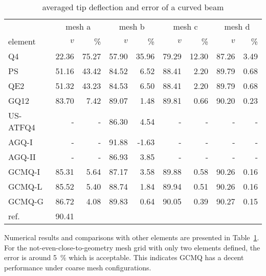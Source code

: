 \documentclass[3p,sort&compress,review,11pt]{elsarticle}
\newcommand*{\tabref}[1]{Table~\ref{#1}}
\begin{document}
\begin{table}[H]
\centering\scriptsize
\caption{averaged tip deflection and error of a curved beam}\label{table:curved_beam}
\begin{tabular}{lrrrrrrrr}
	\toprule
	         & \multicolumn{2}{c}{mesh a} & \multicolumn{2}{c}{mesh b} & \multicolumn{2}{c}{mesh c} & \multicolumn{2}{c}{mesh d} \\
	element  &   $v$ &      \si{\percent} &   $v$ &      \si{\percent} &   $v$ &      \si{\percent} &   $v$ &      \si{\percent} \\ \midrule
	Q4       & 22.36 &              75.27 & 57.90 &              35.96 & 79.29 &              12.30 & 87.26 &               3.49 \\
	PS       & 51.16 &              43.42 & 84.52 &               6.52 & 88.41 &               2.20 & 89.79 &               0.68 \\
	QE2      & 51.32 &              43.23 & 84.53 &               6.50 & 88.41 &               2.20 & 89.79 &               0.68 \\
	GQ12     & 83.70 &               7.42 & 89.07 &               1.48 & 89.81 &               0.66 & 90.20 &               0.23 \\
	US-ATFQ4 &     - &                  - & 86.30 &               4.54 &     - &                  - &     - &                  - \\
	AGQ-I    &     - &                  - & 91.88 &              -1.63 &     - &                  - &     - &                  - \\
	AGQ-II   &     - &                  - & 86.93 &               3.85 &     - &                  - &     - &                  - \\
	GCMQ-I   & 85.31 &               5.64 & 87.17 &               3.58 & 89.88 &               0.58 & 90.26 &               0.16 \\
	GCMQ-L   & 85.52 &               5.40 & 88.74 &               1.84 & 89.94 &               0.51 & 90.26 &               0.16 \\
	GCMQ-G   & 86.72 &               4.08 & 89.83 &               0.64 & 90.05 &               0.39 & 90.27 &               0.15 \\ \midrule
	ref.     & 90.41 &                    &       &                    &       &                    &       &                    \\ \bottomrule
\end{tabular}
\end{table}
Numerical results and comparisons with other elements are presented in \tabref{table:curved_beam}. For the not-even-close-to-geometry mesh grid with only two elements defined, the error is around \SI{5}{\percent} which is acceptable. This indicates GCMQ has a decent performance under coarse mesh configurations.
\end{document}
